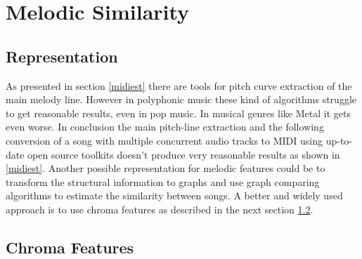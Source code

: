 
\chapter{Melodic Similarity}\label{melsimc}

\section{Representation}

As presented in section \ref{midiest} there are tools for pitch curve extraction of the main melody line. However in polyphonic music these kind of algorithms struggle to get reasonable results, even in pop music. In musical genres like Metal it gets even worse. In conclusion the main pitch-line extraction and the following conversion of a song with multiple concurrent audio tracks to MIDI using up-to-date open source toolkits doesn't produce very reasonable results as shown in \ref{midiest}.
Another possible representation for melodic features could be to transform the structural information to graphs and use graph comparing algorithms to estimate the similarity between songs. \cite{graph1} 
A better and widely used approach is to use chroma features as described in the next section \ref{chromafeat}.

\section{Chroma Features}\label{chromafeat}

